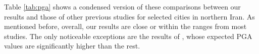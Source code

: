 
Table \ref{tab:pga} shows a condensed version of these comparisons between our results and those of other previous studies for selected cities in northern Iran. As mentioned before, overall, our results are close  or within the ranges from most studies. The only noticeable exceptions are the results of \citet{Golara2014}, whose expected PGA values are significantly higher than the rest. 



